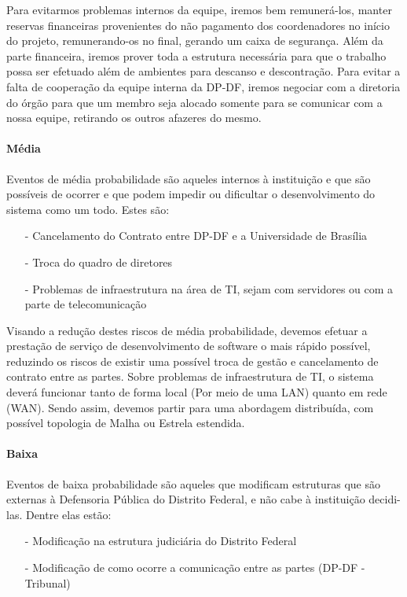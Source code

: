 \documentclass[12pt,a4paper]{report}
\begin{document}
Para evitarmos problemas internos da equipe, iremos bem remunerá-los, manter reservas financeiras provenientes do não pagamento dos coordenadores no início do projeto, remunerando-os no final, gerando um caixa de segurança. Além da parte financeira, iremos prover toda a estrutura necessária para que o trabalho possa ser efetuado além de ambientes para descanso e descontração. Para evitar a falta de cooperação da equipe interna da DP-DF, iremos negociar com a diretoria do órgão para que um membro seja alocado somente para se comunicar com a nossa equipe, retirando os outros afazeres do mesmo.

\paragraph{Média} Eventos de média probabilidade são aqueles internos à instituição e que são possíveis de ocorrer e que podem impedir ou dificultar o desenvolvimento do sistema como um todo. Estes são:
\begin{itemize}
\item [-] Cancelamento do Contrato entre DP-DF e a Universidade de Brasília
\item [-] Troca do quadro de diretores
\item [-] Problemas de infraestrutura na área de TI, sejam com servidores ou com a parte de telecomunicação
\end{itemize}

Visando a redução destes riscos de média probabilidade, devemos efetuar a prestação de serviço de desenvolvimento de software o mais rápido possível, reduzindo os riscos de existir uma possível troca de gestão e cancelamento de contrato entre as partes.
Sobre problemas de infraestrutura de TI, o sistema deverá funcionar tanto de forma local (Por meio de uma LAN) quanto em rede (WAN). Sendo assim, devemos partir para uma abordagem distribuída, com possível topologia de Malha ou Estrela estendida.

\paragraph{Baixa} Eventos de baixa probabilidade são aqueles que modificam estruturas que são externas à Defensoria Pública do Distrito Federal, e não cabe à instituição decidi-las. Dentre elas estão:
\begin{itemize}
\item [-] Modificação na estrutura judiciária do Distrito Federal
\item [-] Modificação de como ocorre a comunicação entre as partes (DP-DF - Tribunal)
\end{itemize}
\end{document}
